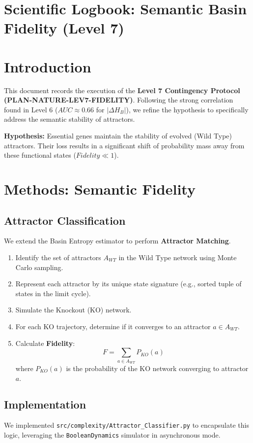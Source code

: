 \documentclass{article}
\begin{document}
\section{Scientific Logbook: Semantic Basin Fidelity (Level 7)}






\section{Introduction}
This document records the execution of the \textbf{Level 7 Contingency Protocol (PLAN-NATURE-LEV7-FIDELITY)}. Following the strong correlation found in Level 6 ($AUC \approx 0.66$ for $|\Delta H_B|$), we refine the hypothesis to specifically address the semantic stability of attractors.

\textbf{Hypothesis:} Essential genes maintain the stability of evolved (Wild Type) attractors. Their loss results in a significant shift of probability mass away from these functional states ($Fidelity \ll 1$).

\section{Methods: Semantic Fidelity}

\subsection{Attractor Classification}
We extend the Basin Entropy estimator to perform \textbf{Attractor Matching}.
\begin{enumerate}
    \item Identify the set of attractors $A_{WT}$ in the Wild Type network using Monte Carlo sampling.
    \item Represent each attractor by its unique state signature (e.g., sorted tuple of states in the limit cycle).
    \item Simulate the Knockout (KO) network.
    \item For each KO trajectory, determine if it converges to an attractor $a \in A_{WT}$.
    \item Calculate \textbf{Fidelity}:
    \[ F = \sum_{a \in A_{WT}} P_{KO}(a) \]
    where $P_{KO}(a)$ is the probability of the KO network converging to attractor $a$.
\end{enumerate}

\subsection{Implementation}
We implemented \texttt{src/complexity/Attractor\_Classifier.py} to encapsulate this logic, leveraging the \texttt{BooleanDynamics} simulator in asynchronous mode.
\end{document}
